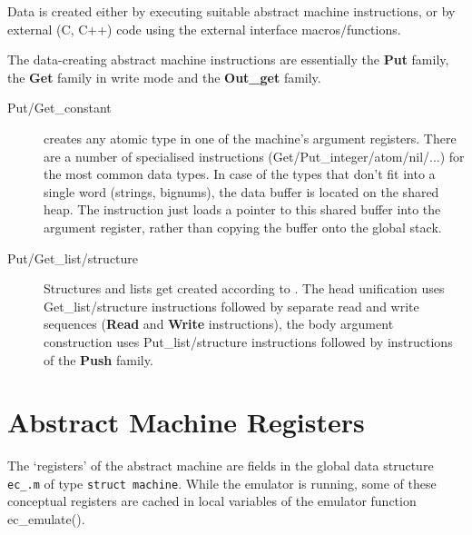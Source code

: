 Data is created either by executing suitable abstract machine
instructions, or by external (C, C++) code using the external
interface macros/functions.

The data-creating abstract machine instructions are essentially the
{\bf Put} family, the {\bf Get} family in write mode and the
{\bf Out_get} family.
\begin{description}
\item[Put/Get_constant] creates any atomic type in one of the
        machine's argument registers.
        There are a number of specialised instructions
        (Get/Put_integer/atom/nil/...) for the most common data types.
        In case of the types that don't
        fit into a single word (strings, bignums), the data buffer is
        located on the shared heap. The instruction just loads a pointer
        to this shared buffer into the argument register, rather than
        copying the buffer onto the global stack.
\item[Put/Get_list/structure]
        Structures and lists get created according to
        \cite{compnd}. The head unification uses Get_list/structure
        instructions followed by separate read and write sequences
        ({\bf Read} and {\bf Write} instructions), the body
        argument construction uses Put_list/structure instructions
        followed by instructions of the {\bf Push} family.
\end{description}


\section{Abstract Machine Registers}

The `registers' of the abstract machine  are fields in the global
data structure {\tt ec_.m} of type {\tt struct machine}.
While the emulator  is running, some of these conceptual registers
are cached in local variables of the emulator function ec_emulate().

